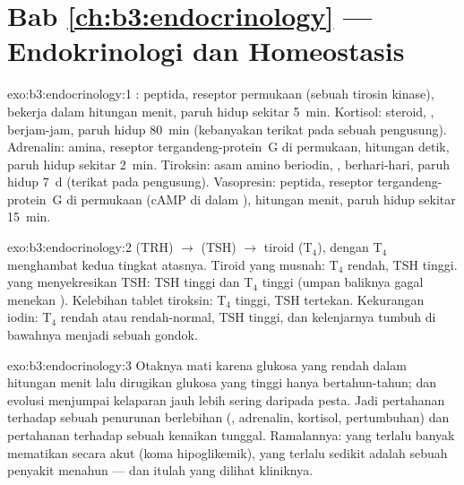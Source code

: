 \section*{Bab \ref{ch:b3:endocrinology} --- Endokrinologi dan Homeostasis}

\begin{solution}{exo:b3:endocrinology:1}
: peptida, reseptor permukaan (sebuah tirosin kinase), bekerja dalam
hitungan menit, paruh hidup sekitar \qty{5}{min}. Kortisol: steroid, , berjam-jam, paruh hidup \qty{80}{min} (kebanyakan terikat pada sebuah pengusung).
Adrenalin: amina, reseptor tergandeng-protein~G di permukaan, hitungan detik,
paruh hidup sekitar \qty{2}{min}. Tiroksin: asam amino beriodin, , berhari-hari, paruh hidup \qty{7}{d} (terikat pada pengusung).
Vasopresin: peptida, reseptor tergandeng-protein~G di permukaan (cAMP di dalam
), hitungan menit, paruh hidup sekitar \qty{15}{min}.
\end{solution}

\begin{solution}{exo:b3:endocrinology:2}
 (TRH) $\to$  (TSH) $\to$ tiroid (T$_{4}$), dengan
T$_{4}$ menghambat kedua tingkat atasnya. Tiroid yang musnah: T$_{4}$ rendah,
TSH tinggi.  yang menyekresikan TSH: TSH tinggi dan T$_{4}$ tinggi (umpan
baliknya gagal menekan ). Kelebihan tablet tiroksin:
T$_{4}$ tinggi, TSH tertekan. Kekurangan iodin: T$_{4}$ rendah atau
rendah-normal, TSH tinggi, dan kelenjarnya tumbuh di bawahnya menjadi sebuah gondok.
\end{solution}

\begin{solution}{exo:b3:endocrinology:3}
Otaknya mati karena glukosa yang rendah dalam hitungan menit lalu dirugikan glukosa yang tinggi
hanya bertahun-tahun; dan evolusi menjumpai kelaparan jauh lebih sering daripada pesta.
Jadi pertahanan terhadap sebuah penurunan berlebihan (, adrenalin,
kortisol,  pertumbuhan) dan pertahanan terhadap sebuah kenaikan tunggal.
Ramalannya:  yang terlalu banyak mematikan secara akut (koma hipoglikemik),
yang terlalu sedikit adalah sebuah penyakit menahun --- dan itulah yang dilihat kliniknya.
\end{solution}

